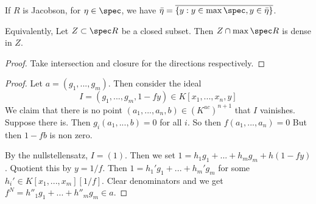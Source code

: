 If $R$ is Jacobson, for $\eta \in \spec$, we have $\bar{\eta}=\overline{\{y:y\in \max\spec ,y\in \bar{\eta}\}}$.


Equivalently, Let $Z\subset \spec R$ be a closed subset. Then $Z\cap \max\spec R$ is dense in $Z$.


\begin{proof}
    Take intersection and closure for the directions respectively.
\end{proof}
\begin{proof}
    Let $a=(g_1,...,g_m)$. Then consider the ideal \[
    I=(g_1,...,g_m, 1-fy)\in K[x_1,...,x_n,y]
    \]
    We claim that there is no point $(a_1,...,a_n,b)\in (K^{ac})^{n+1}$ that $I$ vainishes. 
    Suppose there is. Then $g_i(a_1,...,b)=0$ for all $i$. So then $f(a_1,...,a_n)=0$ But then $1-fb$ is non zero. 

    By the nullstellensatz, $I=(1)$. Then we set $1=h_1g_1+...+h_mg_m+h(1-fy)$. Quotient this by $y=1/f$. Then $1=h_1'g_1+...+h_m'g_m$ for some $h_i'\in K[x_1,...,x_m][1/f]$. Clear denominators and we get $f^N=h''_1g_1+...+h''_mg_m\in a$.
\end{proof}